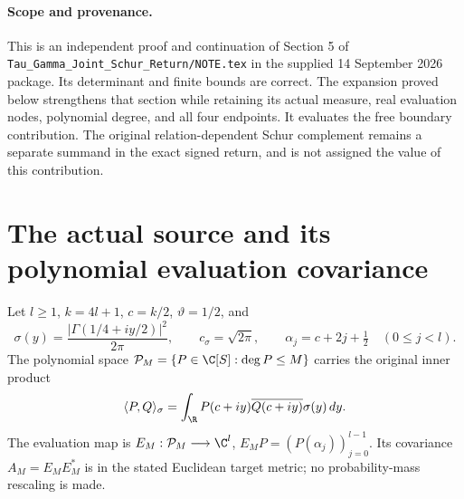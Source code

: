 \paragraph{Scope and provenance.}
This is an independent proof and continuation of Section 5 of
\texttt{Tau\_Gamma\_Joint\_Schur\_Return/NOTE.tex} in the supplied
14 September 2026 package. Its determinant and finite bounds are correct.
The expansion proved below strengthens that section while retaining its
actual measure, real evaluation nodes, polynomial degree, and all four
endpoints. It evaluates the free boundary contribution. The original
relation-dependent Schur complement remains a separate summand in the
exact signed return, and is not assigned the value of this contribution.

\section{The actual source and its polynomial evaluation covariance}
Let $l\ge1$, $k=4l+1$, $c=k/2$, $\vartheta=1/2$, and
\[
 \sigma(y)=\frac{|\Gamma(1/4+iy/2)|^2}{2\pi},\qquad
 c_\sigma=\sqrt{2\pi},\qquad
 \alpha_j=c+2j+\tfrac12\quad(0\le j<l).
\]
The polynomial space $\mathcal P_M=\{P\in\C[S]:\deg P\le M\}$ carries
the original inner product
\[
 \langle P,Q\rangle_\sigma
 =\int_{\R}P(c+iy)\overline{Q(c+iy)}\sigma(y)\,dy.
\]
The evaluation map is
$E_M:\mathcal P_M\longrightarrow\C^l$, $E_MP=(P(\alpha_j))_{j=0}^{l-1}$.
Its covariance $A_M=E_ME_M^*$ is in the stated Euclidean target metric;
no probability-mass rescaling is made.

